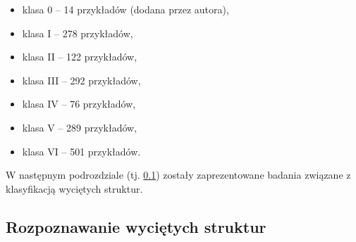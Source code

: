 \begin{itemize}[label=\textbullet]
	\item klasa 0 – 14 przykładów (dodana przez autora),
	\item klasa I – 278 przykładów,
	\item klasa II – 122 przykładów,
	\item klasa III – 292 przykładów,
	\item klasa IV – 76 przykładów,
	\item klasa V – 289 przykładów,
	\item klasa VI – 501 przykładów.
\end{itemize}
W następnym podrozdziale (tj. \ref{klasyfikacja.struktur}) zostały zaprezentowane badania związane z klasyfikacją wyciętych struktur.

\subsection{Rozpoznawanie wyciętych struktur}
\label{klasyfikacja.struktur}

